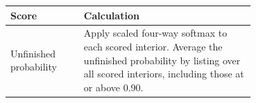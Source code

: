\begin{tabular}{lp{0.70\linewidth}}
\toprule
Score & Calculation \\
\midrule
Unfinished probability & Apply scaled four-way softmax to each scored interior. Average the unfinished probability by listing over all scored interiors, including those at or above 0.90. \\
\bottomrule
\end{tabular}
